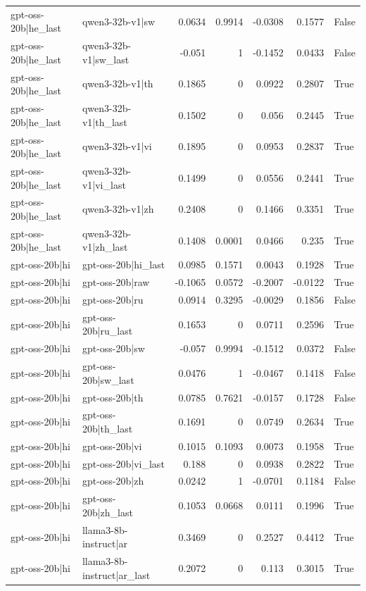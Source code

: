 \begin{table}
\begin{tabular}{l l r r r r l}
gpt-oss-20b|he_last & qwen3-32b-v1|sw & 0.0634 & 0.9914 & -0.0308 & 0.1577 & False \\
gpt-oss-20b|he_last & qwen3-32b-v1|sw_last & -0.051 & 1 & -0.1452 & 0.0433 & False \\
gpt-oss-20b|he_last & qwen3-32b-v1|th & 0.1865 & 0 & 0.0922 & 0.2807 & True \\
gpt-oss-20b|he_last & qwen3-32b-v1|th_last & 0.1502 & 0 & 0.056 & 0.2445 & True \\
gpt-oss-20b|he_last & qwen3-32b-v1|vi & 0.1895 & 0 & 0.0953 & 0.2837 & True \\
gpt-oss-20b|he_last & qwen3-32b-v1|vi_last & 0.1499 & 0 & 0.0556 & 0.2441 & True \\
gpt-oss-20b|he_last & qwen3-32b-v1|zh & 0.2408 & 0 & 0.1466 & 0.3351 & True \\
gpt-oss-20b|he_last & qwen3-32b-v1|zh_last & 0.1408 & 0.0001 & 0.0466 & 0.235 & True \\
gpt-oss-20b|hi & gpt-oss-20b|hi_last & 0.0985 & 0.1571 & 0.0043 & 0.1928 & True \\
gpt-oss-20b|hi & gpt-oss-20b|raw & -0.1065 & 0.0572 & -0.2007 & -0.0122 & True \\
gpt-oss-20b|hi & gpt-oss-20b|ru & 0.0914 & 0.3295 & -0.0029 & 0.1856 & False \\
gpt-oss-20b|hi & gpt-oss-20b|ru_last & 0.1653 & 0 & 0.0711 & 0.2596 & True \\
gpt-oss-20b|hi & gpt-oss-20b|sw & -0.057 & 0.9994 & -0.1512 & 0.0372 & False \\
gpt-oss-20b|hi & gpt-oss-20b|sw_last & 0.0476 & 1 & -0.0467 & 0.1418 & False \\
gpt-oss-20b|hi & gpt-oss-20b|th & 0.0785 & 0.7621 & -0.0157 & 0.1728 & False \\
gpt-oss-20b|hi & gpt-oss-20b|th_last & 0.1691 & 0 & 0.0749 & 0.2634 & True \\
gpt-oss-20b|hi & gpt-oss-20b|vi & 0.1015 & 0.1093 & 0.0073 & 0.1958 & True \\
gpt-oss-20b|hi & gpt-oss-20b|vi_last & 0.188 & 0 & 0.0938 & 0.2822 & True \\
gpt-oss-20b|hi & gpt-oss-20b|zh & 0.0242 & 1 & -0.0701 & 0.1184 & False \\
gpt-oss-20b|hi & gpt-oss-20b|zh_last & 0.1053 & 0.0668 & 0.0111 & 0.1996 & True \\
gpt-oss-20b|hi & llama3-8b-instruct|ar & 0.3469 & 0 & 0.2527 & 0.4412 & True \\
gpt-oss-20b|hi & llama3-8b-instruct|ar_last & 0.2072 & 0 & 0.113 & 0.3015 & True \\

\end{tabular}
\end{table}
